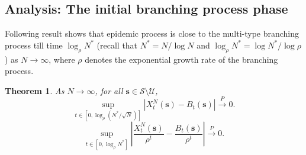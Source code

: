 \documentclass{article}
\newtheorem{theorem}{Theorem}[section]
\theoremstyle{definition}
\begin{document}

   


    \subsection{Analysis: The initial branching process phase}
\label{branching_results}

Following result shows that 
 epidemic process is close to the multi-type branching process till time $ \log_\rho N^*$ (recall that $N^*= N/\log N$ and $\log_\rho N^* = \log {N^*}/\log \rho$)
 as $N \rightarrow \infty$, where $\rho$ denotes the exponential growth rate of the branching process.


\begin{theorem} As $N\rightarrow\infty$, for all $\bm{s}\in \mathcal S \setminus  \mathcal U$,
        \begin{equation}
           \sup\limits_{t \in [0, \log_\rho ({N^*}/{\sqrt{N}})]} \left\lvert{X}_t^N(\bm{s})  - {B}_t(\bm{s}) \right\rvert \xrightarrow{P} 0.  
           \label{e_b_close_1}
        \end{equation}
        \begin{equation}
        \sup\limits_{t\in \left[0, \log_\rho N^*\right]} \left\lvert{\frac{{X}_t^N(\bm{s})}{\rho^t} - \frac{{B}_t(\bm{s})}{\rho^t}}\right\rvert \xrightarrow{P} 0.
        \label{e_b_close_2}
        \end{equation}
     \label{e_b_close}   
\end{theorem}
 
\end{document}
